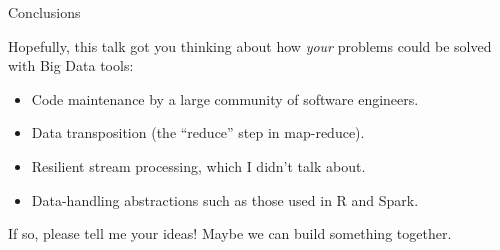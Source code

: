 \documentclass{beamer}
\begin{document}
\begin{frame}{Conclusions}

Hopefully, this talk got you thinking about how {\it your} problems could be solved with Big Data tools:
\begin{itemize}
\item Code maintenance by a large community of software engineers.
\item Data transposition (the ``reduce'' step in map-reduce).
\item Resilient stream processing, which I didn't talk about.
\item Data-handling abstractions such as those used in R and Spark.
\end{itemize}

\vfill
If so, please tell me your ideas! Maybe we can build something together.
\end{frame}
\end{document}
